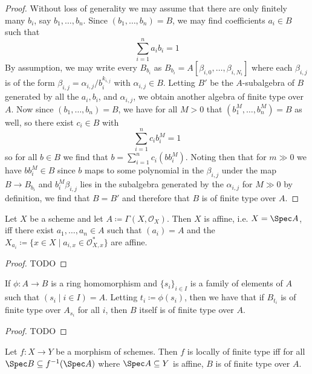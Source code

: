 \documentclass[wip, algebra]{bsteffan-lecturenotes}
\newcommand{\cO}{\mathcal{O}}
\begin{document}
\begin{proof}
	Without loss of generality we may assume that there are only finitely many $b_i$, say $b_1, \ldots, b_n$.
	Since $(b_1, \ldots, b_n) = B$, we may find coefficients $a_i \in B$ such that
	\begin{equation*}
		\sum_{i = 1}^n a_i b_i = 1
	\end{equation*}
	By assumption, we may write every $B_{b_i}$ as $B_{b_i} = A[\beta_{i, 0}, \ldots, \beta_{i, N_i}]$ where each $\beta_{i, j}$ is of the form $\beta_{i, j} = \alpha_{i, j} / b_i^{k_{i, j}}$ with $\alpha_{i, j} \in B$.
	Letting $B'$ be the $A$-subalgebra of $B$ generated by all the $a_i, b_i$, and $\alpha_{i, j}$, we obtain another algebra of finite type over $A$.
	Now since $(b_1, \ldots, b_n) = B$, we have for all $M > 0$ that $(b_1^M, \ldots, b_n^M) = B$ as well, so there exist $c_i \in B$ with
	\begin{equation*}
		\sum_{i = 1}^n c_i b_i^M = 1
	\end{equation*}
	so for all $b \in B$ we find that $b = \sum_{i = 1}^n c_i (b b_i^M)$.
	Noting then that for $m \gg 0$ we have $b b_i^M \in B$ since $b$ maps to some polynomial in the $\beta_{i, j}$ under the map $B \to B_{b_i}$ and $b_i^M \beta_{i, j}$ lies in the subalgebra generated by the $\alpha_{i, j}$ for $M \gg 0$ by definition, we find that $B = B'$ and therefore that $B$ is of finite type over $A$. 
\end{proof}
\begin{proposition}
	Let $X$ be a scheme and let $A \coloneq \Gamma(X, \cO_X)$.
	Then $X$ is affine, i.e. $X = \Spec A$, iff there exist $a_1, \ldots, a_n \in A$ such that $(a_i) = A$ and the $X_{a_i} \coloneq \{x \in X \mid a_{i, x} \in \cO_{X, x}^*\}$ are affine.
\end{proposition}
\begin{proof}
	TODO
\end{proof}
\begin{proposition}
	If $\phi\colon A \to B$ is a ring homomorphism and $\{s_i\}_{i \in I}$ is a family of elements of $A$ such that $(s_i \mid i \in I) = A$.
	Letting $t_i \coloneq \phi(s_i)$, then we have that if $B_{t_i}$ is of finite type over $A_{s_i}$ for all $i$, then $B$ itself is of finite type over $A$.
\end{proposition}
\begin{proof}
	TODO
\end{proof}
\begin{proposition}
	Let $f\colon X \to Y$ be a morphism of schemes.
	Then $f$ is locally of finite type iff for all $\Spec B \subseteq f^{-1}(\Spec A)$ where $\Spec A \subseteq Y$ is affine, $B$ is of finite type over $A$.
\end{proposition}
\end{document}
